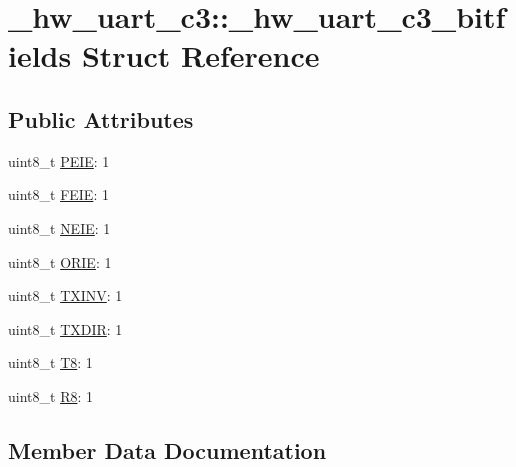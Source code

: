 \hypertarget{struct__hw__uart__c3_1_1__hw__uart__c3__bitfields}{}\section{\+\_\+hw\+\_\+uart\+\_\+c3\+:\+:\+\_\+hw\+\_\+uart\+\_\+c3\+\_\+bitfields Struct Reference}
\label{struct__hw__uart__c3_1_1__hw__uart__c3__bitfields}
\subsection*{Public Attributes}
\begin{DoxyCompactItemize}
\item 
uint8\+\_\+t \hyperlink{struct__hw__uart__c3_1_1__hw__uart__c3__bitfields_a72e3235a75104b23b9eb18c28e9b19db}{P\+E\+IE}\+: 1
\item 
uint8\+\_\+t \hyperlink{struct__hw__uart__c3_1_1__hw__uart__c3__bitfields_acd176731b98255b1cea0d48891b9db55}{F\+E\+IE}\+: 1
\item 
uint8\+\_\+t \hyperlink{struct__hw__uart__c3_1_1__hw__uart__c3__bitfields_a672ef3b05f9d34155304704d9f57205f}{N\+E\+IE}\+: 1
\item 
uint8\+\_\+t \hyperlink{struct__hw__uart__c3_1_1__hw__uart__c3__bitfields_acd18af28bd9aff1c0c35518aca9ecda4}{O\+R\+IE}\+: 1
\item 
uint8\+\_\+t \hyperlink{struct__hw__uart__c3_1_1__hw__uart__c3__bitfields_af67bb2128af738831c3e38354c2978e1}{T\+X\+I\+NV}\+: 1
\item 
uint8\+\_\+t \hyperlink{struct__hw__uart__c3_1_1__hw__uart__c3__bitfields_a4189ffc40d5ddd43e42653c873bdf9f8}{T\+X\+D\+IR}\+: 1
\item 
uint8\+\_\+t \hyperlink{struct__hw__uart__c3_1_1__hw__uart__c3__bitfields_ae255d78f926f2849d8bd68cd46399391}{T8}\+: 1
\item 
uint8\+\_\+t \hyperlink{struct__hw__uart__c3_1_1__hw__uart__c3__bitfields_a24bce9523862455d28e443eb1cfd58fc}{R8}\+: 1
\end{DoxyCompactItemize}


\subsection{Member Data Documentation}
